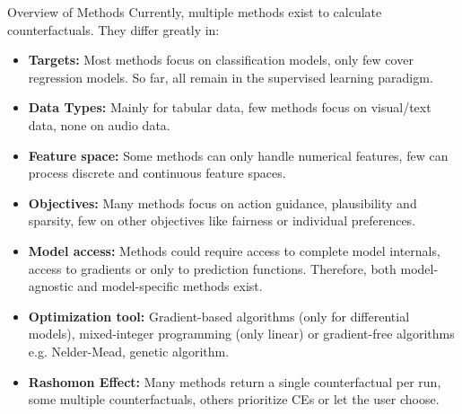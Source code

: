 \documentclass[11pt,compress,t,notes=noshow, xcolor=table]{beamer}
\begin{document}
\begin{vbframe}{Overview of Methods}
	Currently, multiple methods exist to calculate counterfactuals. They differ greatly in: 
	\begin{itemize}
		\item \textbf{Targets:} Most methods focus on classification models, only few cover regression models. So far, all remain in the supervised learning paradigm.
		\item \textbf{Data Types:} Mainly for tabular data, few methods focus on visual/text data, none on audio data.
		\item \textbf{Feature space:} Some methods can only handle numerical features, few can process discrete and continuous feature spaces. 
		\item \textbf{Objectives:} Many methods focus on action guidance, plausibility and sparsity, few on other objectives like fairness or individual preferences.
		\framebreak
		\item \textbf{Model access:} Methods could require access to complete model internals, access to gradients or only to prediction functions. Therefore, both model-agnostic and model-specific methods exist.
		\item \textbf{Optimization tool:} Gradient-based algorithms (only for differential models), mixed-integer programming (only linear) or gradient-free algorithms e.g. Nelder-Mead, genetic algorithm. 
		\item \textbf{Rashomon Effect:} Many methods return a single counterfactual per run, some multiple counterfactuals, others prioritize CEs or let the user choose.
	\end{itemize}
\end{vbframe}
\end{document}

